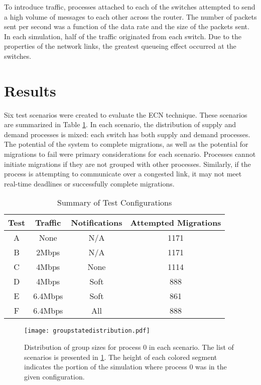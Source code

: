 To introduce traffic, processes attached to each of the switches attempted to send a high volume of messages to each other across the router.
The number of packets sent per second was a function of the data rate and the size of the packets sent.
In each simulation, half of the traffic originated from each switch.
Due to the properties of the network links, the greatest queueing effect occurred at the switches.

\section{Results}
\label{sect:results}
Six test scenarios were created to evaluate the \ac{ECN} technique.
These scenarios are summarized in Table \ref{tab:scenarios}.
In each scenario, the distribution of supply and demand processes is mixed: each switch has both supply and demand processes.
The potential of the system to complete migrations, as well as the potential for migrations to fail were primary considerations for each scenario.
Processes cannot initiate migrations if they are not grouped with other processes.
Similarly, if the process is attempting to communicate over a congested link, it may not meet real-time deadlines or successfully complete migrations.

\begin{table}
\centering
\caption{Summary of Test Configurations}
\begin{tabular}{| c | c | c | c |}
    \hline
    Test & Traffic & Notifications & Attempted Migrations \\ \hline
    A & None & N/A & 1171 \\ \hline
    B & 2Mbps & N/A & 1171 \\ \hline
    C & 4Mbps & None & 1114  \\ \hline
    D & 4Mbps & Soft & 888 \\ \hline
    E & 6.4Mbps & Soft & 861 \\ \hline
    F & 6.4Mbps & All & 888 \\ \hline
\end{tabular}
\label{tab:scenarios}
\end{table}

\begin{figure}
\centering
\texttt{[image: groupstatedistribution.pdf]}
\caption[Distribution of group sizes for process 0 in each scenario.]{Distribution of group sizes for process 0 in each scenario. The list of scenarios is presented in \ref{tab:scenarios}.  The height of each colored segment indicates the portion of the simulation where process 0 was in the given configuration.}
\label{fig:groupstatedistro}
\end{figure}

